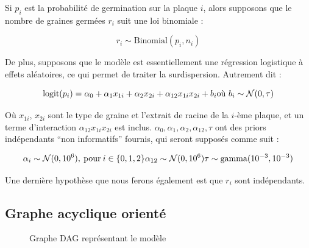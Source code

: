 \documentclass[
]{article}
\begin{document}
Si \(p_i\) est la probabilité de germination sur la plaque \(i\), alors
supposons que le nombre de graines germées \(r_i\) suit une loi
binomiale :

\[
r_i \sim \text{Binomial}(p_i,n_i)
\]

De plus, supposons que le modèle est essentiellement une régression
logistique à effets aléatoires, ce qui permet de traiter la
surdispersion. Autrement dit :

\[
  \text{logit}(p_i) = \alpha_0 + \alpha_1x_{1i} + \alpha_2x_{2i} + \alpha_{12}x_{1i}x_{2i} + b_i \\
  \text{où } b_i \sim \mathcal{N}(0,\tau)
\]

Où \(x_{1i}\), \(x_{2i}\) sont le type de graine et l'extrait de racine
de la \(i\)-ème plaque, et un terme d'interaction
\(\alpha_{12}x_{1i}x_{2i}\) est inclus.
\(\alpha_0, \alpha_1, \alpha_2, \alpha_{12}, \tau\) ont des priors
indépendants ``non informatifs'' fournis, qui seront supposés comme suit
:

\[
  \alpha_i \sim \mathcal{N}(0, 10^6), \: \text{pour} \: i \in \{0, 1, 2\} \\
  \alpha_{12} \sim \mathcal{N}(0, 10^6) \\
  \tau \sim \text{gamma}(10^{-3}, 10^{-3})
\]

Une dernière hypothèse que nous ferons également est que \(r_i\) sont
indépendants.

\hypertarget{graphe-acyclique-orientuxe9}{%
\subsection{Graphe acyclique
orienté}\label{graphe-acyclique-orientuxe9}}

\usepackage{tikz}
\usetikzlibrary{shapes,arrows.meta, positioning}
\begin{figure}
    \centering
    \caption{Graphe DAG représentant le modèle}
\end{figure}
\end{document}
